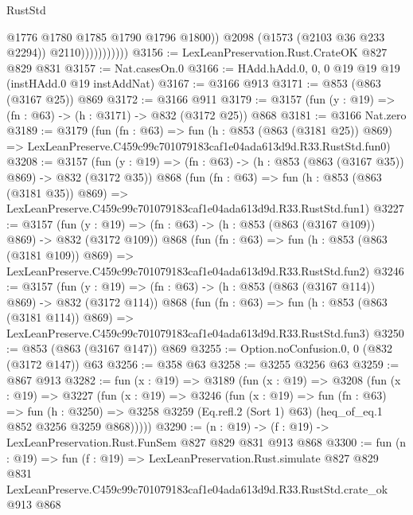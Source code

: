 \begin{lexlean}{RustStd}
\begin{coremodule}
                              @1776
                              @1780
                              @1785
                              @1790
                              @1796
                              @1800))
                          @2098
                          (@1573 (@2103 @36 @233 @2294))
                          @2110)))))))))))
@3156 := LexLeanPreservation.Rust.CrateOK @827 @829 @831
@3157 := Nat.casesOn.{0}
@3166 := HAdd.hAdd.{0, 0, 0} @19 @19 @19 (instHAdd.{0} @19 instAddNat)
@3167 := @3166 @913
@3171 := @853 (@863 (@3167 @25)) @869
@3172 := @3166 @911
@3179 := @3157 (fun (y : @19) => (fn : @63) -> (h : @3171) -> @832 (@3172 @25)) @868
@3181 := @3166 Nat.zero
@3189 := @3179
    (fun (fn : @63) =>
    fun (h : @853 (@863 (@3181 @25)) @869) =>
    LexLeanPreserve.C459c99c701079183caf1e04ada613d9d.R33.RustStd.fun0)
@3208 := @3157
    (fun (y : @19) => (fn : @63) -> (h : @853 (@863 (@3167 @35)) @869) -> @832 (@3172 @35))
    @868
    (fun (fn : @63) =>
    fun (h : @853 (@863 (@3181 @35)) @869) =>
    LexLeanPreserve.C459c99c701079183caf1e04ada613d9d.R33.RustStd.fun1)
@3227 := @3157
    (fun (y : @19) => (fn : @63) -> (h : @853 (@863 (@3167 @109)) @869) -> @832 (@3172 @109))
    @868
    (fun (fn : @63) =>
    fun (h : @853 (@863 (@3181 @109)) @869) =>
    LexLeanPreserve.C459c99c701079183caf1e04ada613d9d.R33.RustStd.fun2)
@3246 := @3157
    (fun (y : @19) => (fn : @63) -> (h : @853 (@863 (@3167 @114)) @869) -> @832 (@3172 @114))
    @868
    (fun (fn : @63) =>
    fun (h : @853 (@863 (@3181 @114)) @869) =>
    LexLeanPreserve.C459c99c701079183caf1e04ada613d9d.R33.RustStd.fun3)
@3250 := @853 (@863 (@3167 @147)) @869
@3255 := Option.noConfusion.{0, 0} (@832 (@3172 @147)) @63
@3256 := @358 @63
@3258 := @3255 @3256 @63
@3259 := @867 @913
@3282 := fun (x : @19) =>
  @3189
    (fun (x : @19) =>
    @3208
      (fun (x : @19) =>
      @3227
        (fun (x : @19) =>
        @3246
          (fun (x : @19) =>
          fun (fn : @63) =>
          fun (h : @3250) =>
          @3258 @3259 (Eq.refl.{2} (Sort 1) @63) (heq_of_eq.{1} @852 @3256 @3259 @868)))))
@3290 := (n : @19) -> (f : @19) -> LexLeanPreservation.Rust.FunSem @827 @829 @831 @913 @868
@3300 := fun (n : @19) =>
  fun (f : @19) =>
  LexLeanPreservation.Rust.simulate
    @827
    @829
    @831
    LexLeanPreserve.C459c99c701079183caf1e04ada613d9d.R33.RustStd.crate_ok
    @913
    @868
\end{coremodule}
\end{lexlean}
